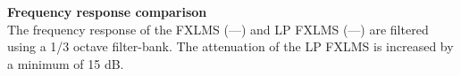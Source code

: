 \begin{minipage}{.43\columnwidth}
\textbf{Frequency response comparison}\\
The frequency response of the FXLMS (\textcolor{MATLABblue}{---}) and LP FXLMS (\textcolor{MATLABred}{---}) are filtered using a 1/3 octave filter-bank.
The attenuation of the LP FXLMS is increased by a minimum of 15 dB.


\end{minipage}%
\hspace{5mm}
\begin{minipage}{0.5\columnwidth}
	\begin{center}
	
	\end{center}
\end{minipage}
